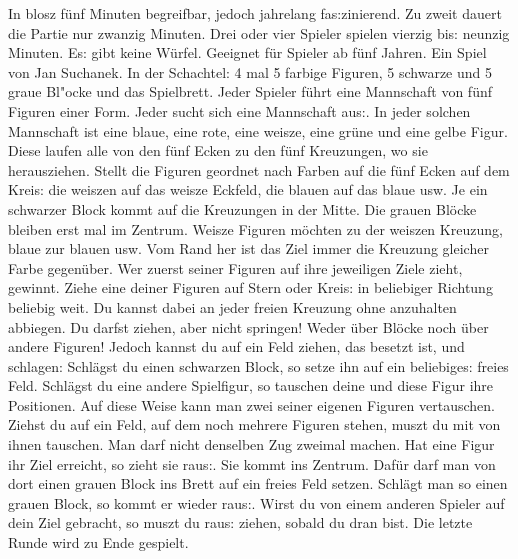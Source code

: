 \begingroup
\footnotesize
\frakfamily
In blosz f{\"u}nf Mi\-nut\-en begreifbar, jedoch jahrelang fas:zinierend. Zu zweit dauert die Partie nur zwanzig Minuten. Drei oder vier Spieler spielen vierzig bis: neunzig Minuten. Es: gibt keine 
W{\"u}rfel. Geeignet f{\"u}r Spieler ab f{\"u}nf Jahren. Ein Spiel von Jan Suchanek. In der Schachtel: 4 mal 5 farbige Figuren, 5 schwarze und 5 graue Bl"ocke und das Spielbrett.
Jeder Spieler f{\"u}hrt eine Mannschaft von f{\"u}nf Figuren einer Form.
Jeder sucht sich eine Mannschaft aus:.
In jeder solchen Mannschaft ist  eine blaue, eine rote, eine weisze, eine gr{\"u}ne und eine gelbe Figur.
Diese laufen alle von den f{\"u}nf Ecken zu den f{\"u}nf Kreuzungen, wo sie herausziehen.
Stellt die Figuren geordnet nach Farben auf die f{\"u}nf Ecken auf dem Kreis: die weiszen auf das weisze Eckfeld, die blauen auf das blaue usw.
Je ein schwarzer Block kommt auf die Kreuzungen in der Mitte.
Die grauen Blöcke bleiben erst mal im Zentrum.
Weisze Figuren möchten zu der weiszen Kreuzung, blaue zur blauen usw. 
Vom Rand her ist das Ziel immer die Kreuzung gleicher Farbe gegen{\"u}ber.
Wer zuerst  seiner Figuren auf ihre jeweiligen Ziele zieht, gewinnt.
Ziehe eine deiner Figuren auf Stern oder Kreis: in beliebiger Richtung beliebig weit.
Du kannst dabei an jeder freien Kreuzung ohne anzuhalten abbiegen.
Du darfst ziehen, aber nicht springen! Weder {\"u}ber Blöcke noch {\"u}ber andere Figuren!
Jedoch kannst du auf ein Feld ziehen, das besetzt ist, und schlagen:
Schlägst du einen schwarzen Block, so setze ihn auf ein beliebiges: freies Feld. 
Schlägst du eine andere Spielfigur, so tauschen deine und diese Figur ihre Positionen.
Auf diese Weise kann man zwei seiner eigenen Figuren vertauschen.
Ziehst du auf ein Feld, auf dem noch mehrere Figuren stehen, muszt du mit  von ihnen tauschen.
Man darf nicht denselben Zug zweimal machen. 
Hat eine Figur ihr Ziel erreicht, so zieht sie raus:. Sie kommt ins Zentrum. Daf{\"u}r darf man von dort einen grauen Block ins Brett auf ein freies Feld setzen. 
Schl{\"a}gt man so einen grauen Block, so kommt er wieder raus:.
Wirst du von einem anderen Spieler auf dein Ziel gebracht, so muszt du raus: 
ziehen, sobald du dran bist. Die letzte Runde wird
zu Ende gespielt.
\endgroup
%